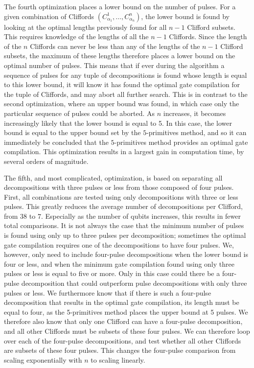     The fourth optimization places a lower bound on the number of pulses. For a given combination of Cliffords $\left(C_{\alpha_1}^1, \dots, C_{\alpha_n}^n\right)$, the lower bound is found by looking at the optimal lengths previously found for all $n-1$ Clifford subsets. This requires knowledge of the lengths of all the $n-1$ Cliffords. Since the length of the $n$ Cliffords can never be less than any of the lengths of the $n-1$ Clifford subsets, the maximum of these lengths therefore places a lower bound on the optimal number of pulses. This means that if ever during the algorithm a sequence of pulses for any tuple of decompositions is found whose length is equal to this lower bound, it will know it has found the optimal gate compilation for the tuple of Cliffords, and may abort all further search. This is in contrast to the second optimization, where an upper bound was found, in which case only the particular sequence of pulses could be aborted. As $n$ increases, it becomes increasingly likely that the lower bound is equal to 5. In this case, the lower bound is equal to the upper bound set by the $5$-primitives method, and so it can immediately be concluded that the $5$-primitives method provides an optimal gate compilation. This optimization results in a largest gain in computation time, by several orders of magnitude.

    The fifth, and most complicated, optimization, is based on separating all decompositions with three pulses or less from those composed of four pulses. First, all combinations are tested using only decompositions with three or less pulses. This greatly reduces the average number of decompositions per Clifford, from $38$ to $7$. Especially as the number of qubits increases, this results in fewer total comparisons. It is not always the case that the minimum number of pulses is found using only up to three pulses per decomposition; sometimes the optimal gate compilation requires one of the decompositions to have four pulses. We, however, only need to include four-pulse decompositions when the lower bound is four or less, and when the minimum gate compilation found using only three pulses or less is equal to five or more. Only in this case could there be a four-pulse decomposition that could outperform pulse decompositions with only three pulses or less. We furthermore know that if there is such a four-pulse decomposition that results in the optimal gate compilation, its length must be equal to four, as the 5-primitives method places the upper bound at 5 pulses. We therefore also know that only one Clifford can have a four-pulse decomposition, and all other Cliffords must be subsets of these four pulses. We can therefore loop over each of the four-pulse decompositions, and test whether all other Cliffords are subsets of these four pulses. This changes the four-pulse comparison from scaling exponentially with $n$ to scaling linearly.

